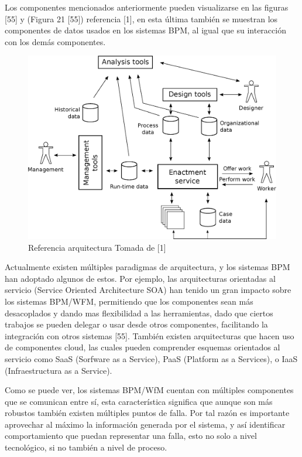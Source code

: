Los componentes mencionados anteriormente pueden visualizarse en las figuras [55] y (Figura 21 [55]) referencia [1], en esta última también se muestran los componentes de datos usados en los sistemas BPM, al igual que su interacción con los demás componentes.

\begin{figure}[htbp!] 
\centering    
\includegraphics[width=1.0\textwidth]{Chapter1/Figs/Figure_referenceBPM}
\caption[ReferenceBPM]{Referencia arquitectura Tomada de [1]}
\label{fig:ReferenceBPM}
\end{figure}

Actualmente existen múltiples paradigmas de arquitectura, y los sistemas BPM han adoptado algunos de estos. Por ejemplo, las arquitecturas orientadas al servicio (Service Oriented Architecture SOA) han tenido un gran impacto sobre los sistemas BPM/WFM, permitiendo que los componentes sean más desacoplados y dando mas flexibilidad a las herramientas, dado que ciertos trabajos se pueden delegar o usar desde otros componentes, facilitando la integración con otros sistemas [55]. También existen arquitecturas que hacen uso de componentes cloud, las cuales pueden comprender esquemas orientados al servicio como SaaS (Sorfware as a Service), PaaS (Platform as a Services), o IaaS (Infraestructura as a Service). 

Como se puede ver, los sistemas BPM/WfM cuentan con múltiples componentes que se comunican entre sí, esta característica significa que aunque son más robustos también existen múltiples puntos de falla. Por tal razón es importante aprovechar al máximo la información generada por el sistema, y así identificar comportamiento que puedan representar una falla, esto no solo a nivel tecnológico, si no también a nivel de proceso.

